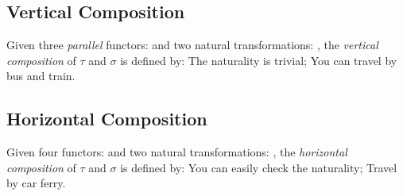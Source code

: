 \subsection{Vertical Composition}

Given three \textit{parallel} functors:
and two natural transformations:
, the \textit{vertical composition} of $\tau$ and $\sigma$ is defined by:
The naturality is trivial; You can travel by bus and train.

\subsection{Horizontal Composition}

Given four functors:
and two natural transformations:
, the \textit{horizontal composition} of $\tau$ and $\sigma$ is defined by:
You can easily check the naturality; Travel by car ferry.

